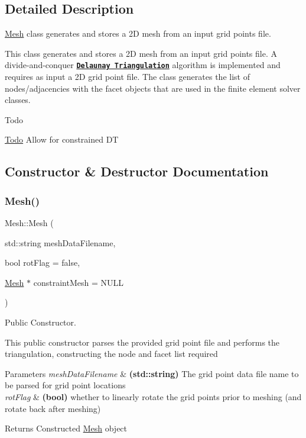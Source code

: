 \subsection{Detailed Description}
\mbox{\hyperlink{class_mesh}{Mesh}} class generates and stores a 2D mesh from an input grid points file. 

This class generates and stores a 2D mesh from an input grid points file. A divide-\/and-\/conquer {\bfseries \href{https://en.wikipedia.org/wiki/Delaunay_triangulation}{\tt Delaunay Triangulation}} algorithm is implemented and requires as input a 2D grid point file. The class generates the list of nodes/adjacencies with the facet objects that are used in the finite element solver classes. \begin{DoxyRefDesc}{Todo}
\item[\mbox{\hyperlink{todo__todo000007}{Todo}}]Allow for constrained DT \end{DoxyRefDesc}


\subsection{Constructor \& Destructor Documentation}
\mbox{\label{class_mesh_accec9e9595c1e3a0d915344b7dda4a82}} 
\subsubsection{\texorpdfstring{Mesh()}{Mesh()}}
{\footnotesize\ttfamily Mesh\+::\+Mesh (\begin{DoxyParamCaption}\item[{std\+::string}]{mesh\+Data\+Filename,  }\item[{bool}]{rot\+Flag = {\ttfamily false},  }\item[{\mbox{\hyperlink{class_mesh}{Mesh}} $\ast$}]{constraint\+Mesh = {\ttfamily NULL} }\end{DoxyParamCaption})}



Public Constructor. 

This public constructor parses the provided grid point file and performs the triangulation, constructing the node and facet list required 
\begin{DoxyParams}{Parameters}
{\em mesh\+Data\+Filename} & {\bfseries (std\+::string)} The grid point data file name to be parsed for grid point locations \\
\hline
{\em rot\+Flag} & {\bfseries (bool)} whether to linearly rotate the grid points prior to meshing (and rotate back after meshing) \\
\hline
\end{DoxyParams}
\begin{DoxyReturn}{Returns}
Constructed \mbox{\hyperlink{class_mesh}{Mesh}} object 
\end{DoxyReturn}
\mbox{\label{class_mesh_a5efe4da1a4c0971cfb037bd70304c303}} 
